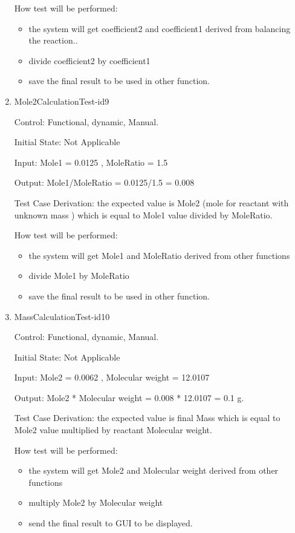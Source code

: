 \documentclass[12pt, titlepage]{article}
\begin{document}
\begin{enumerate}
How test will be performed: 
\begin{itemize}
\item the system will get coefficient2 and coefficient1 derived from balancing the reaction..
\item divide coefficient2 by coefficient1  
\item save the final result to be used in other function.
\end{itemize}

\item{Mole2CalculationTest-id9\\}

Control: Functional, dynamic, Manual.
					
Initial State: Not Applicable
					
Input: Mole1 = 0.0125  , MoleRatio = 1.5
			
Output:  Mole1/MoleRatio = 0.0125/1.5 =  0.008

Test Case Derivation: the expected value is Mole2 (mole for reactant with unknown mass ) which is equal to Mole1 value divided by MoleRatio.  				
	
How test will be performed: 
\begin{itemize}
\item the system will get Mole1 and MoleRatio derived from other functions
\item divide Mole1 by MoleRatio  
\item save the final result to be used in other function.
\end{itemize}

\item{MassCalculationTest-id10\\}

Control: Functional, dynamic, Manual.
					
Initial State: Not Applicable
					
Input: Mole2 = 0.0062  , Molecular weight = 12.0107
			
Output:  Mole2 * Molecular weight = 0.008 * 12.0107 = 0.1 g.

Test Case Derivation: the expected value is final Mass which is equal to Mole2 value multiplied by reactant Molecular weight.  				

How test will be performed: 
\begin{itemize}
\item the system will get Mole2 and Molecular weight derived from other functions
\item multiply Mole2 by Molecular weight  
\item send the final result to GUI to be displayed.
\end{itemize}

\end{enumerate}		
	
\end{document}
